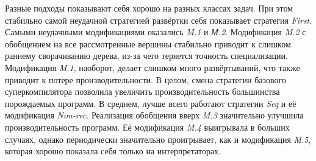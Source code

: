 % 


Разные подходы показывают себя хорошо на разных классах задач.
При этом стабильно самой неудачной стратегией развёртки себя
показывает стратегия {\it First}. Самыми неудачными модификациями оказались
{\it M.1} и {\it М.2}.
Модификация \textit{M.2} с обобщением на все рассмотренные вершины стабильно приводит
к слишком раннему сворачиванию дерева, из-за чего теряется точность специализации.
Модификация \textit{M.1}, наоборот, делает слишком много развёртываний, что также
приводит к потере производительности.
В целом, смена стратегии базового суперкомпилятора позволила увеличить
производительность большинства порождаемых программ. В среднем, лучше
всего работают стратегии \textit{Seq} и её модификация \textit{Non-rec}.
Реализация обобщения вверх \textit{M.3} значительно улучшила производительность программ.
Её модификация \textit{M.4} выигрывала в больших случаях, однако периодически
значительно проигрывает, как и модификация \textit{M.5}, которая хорошо показала
себя только на интерпретаторах.

